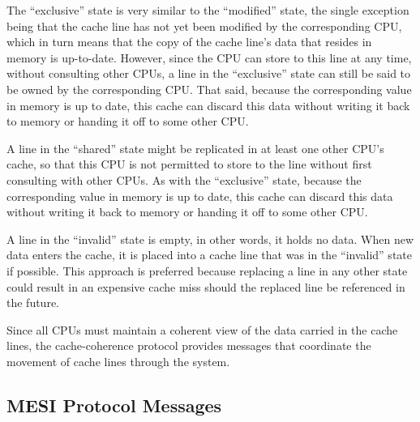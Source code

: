 The ``exclusive'' state is very similar to the ``modified'' state,
the single exception being that the cache line has not yet been
modified by the corresponding CPU, which in turn means that the
copy of the cache line's data that resides in memory is up-to-date.
However, since the CPU can store to this line at any time, without
consulting other CPUs, a line in the ``exclusive'' state can still
be said to be owned by the corresponding CPU.
That said, because the corresponding value in memory is up to date,
this cache can discard this data without writing it back to memory
or handing it off to some other CPU.

A line in the ``shared'' state might be replicated in at least
one other CPU's cache, so that this CPU is not permitted to store
to the line without first consulting with other CPUs.
As with the ``exclusive'' state, because the corresponding value
in memory is up to date,
this cache can discard this data without writing it back to memory
or handing it off to some other CPU.

A line in the ``invalid'' state is empty, in other words, it holds
no data.
When new data enters the cache, it is placed into a
cache line that was in the ``invalid'' state if possible.
This approach is preferred because replacing a line in any other
state could result in an expensive cache miss should the replaced
line be referenced in the future.

Since all CPUs must maintain a coherent view of the data carried in
the cache lines, the cache-coherence protocol provides messages
that coordinate the movement of cache lines through the system.

\subsection{MESI Protocol Messages}
\label{sec:app:whymb:MESI Protocol Messages}

